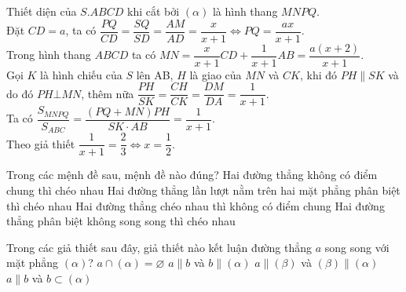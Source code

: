 \begin{ex}
{	 Thiết diện của $S.ABCD$ khi cắt bởi $(\alpha)$ là hình thang $MNPQ$.\\
	Đặt $CD=a$, ta có  $\dfrac{PQ}{CD}=\dfrac{SQ}{SD}=\dfrac{AM}{AD}=\dfrac{x}{x+1}\Leftrightarrow PQ=\dfrac{ax}{x+1}$. \\
		Trong hình thang $ABCD$ ta có $MN=\dfrac{x}{x+1}CD+\dfrac{1}{x+1}AB=\dfrac{a(x+2)}{x+1}$.\\
		Gọi $K$ là hình chiếu của $S$ lên AB, $H$ là giao của $MN$ và $CK$, khi đó $PH \parallel SK$ và do đó $PH\bot MN$, thêm nữa $\dfrac{PH}{SK}=\dfrac{CH}{CK}=\dfrac{DM}{DA}=\dfrac{1}{x+1}$.\\
		Ta có $\dfrac{S_{MNPQ}}{S_{ABC}}=\dfrac{(PQ+MN)PH}{SK\cdot AB}=\dfrac{1}{x+1}$.\\
		Theo giả thiết $\dfrac{1}{x+1}=\dfrac{2}{3}\Leftrightarrow x=\dfrac{1}{2}$.  }
\end{ex}
\begin{ex}%
	Trong các mệnh đề sau, mệnh đề nào đúng?
	\choice
	{Hai đường thẳng không có điểm chung thì chéo nhau}
	{Hai đường thẳng lần lượt nằm trên hai mặt phẳng phân biệt thì chéo nhau}
	{\True Hai đường thẳng chéo nhau thì không có điểm chung}
	{Hai đường thẳng phân biệt không song song thì chéo nhau}
\end{ex}
\begin{ex}%
	Trong các giả thiết sau đây, giả thiết nào kết luận đường thẳng $a$ song song với mặt phẳng $(\alpha)$?
	\choice
	{\True $a\cap (\alpha)=\varnothing$}
	{$a\parallel b$ và $b\parallel (\alpha)$}
	{$a\parallel (\beta)$ và $(\beta)\parallel (\alpha)$}
	{$a\parallel b$ và $b\subset (\alpha)$}
\end{ex}
